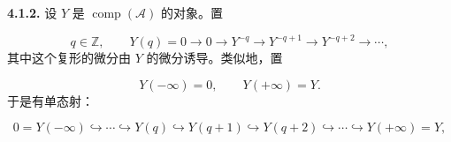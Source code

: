 \medskip\noindent\textbf{4.1.2.}\quad
设 $Y$ 是 $\operatorname{comp}(\mathcal A)$ 的对象。置

\begin{equation}
q\in\mathbb Z,\qquad
Y(q)=0\longrightarrow0\longrightarrow Y^{-q}\longrightarrow
Y^{-q+1}\longrightarrow Y^{-q+2}\longrightarrow\cdots,
\tag{4.1.2.1}
\end{equation}
其中这个复形的微分由 $Y$ 的微分诱导。类似地，置

\begin{equation}
Y(-\infty)=0,\qquad Y(+\infty)=Y.
\tag{4.1.2.2}
\end{equation}
于是有单态射：

\[
0=Y(-\infty)\hookrightarrow\cdots\hookrightarrow Y(q)
\hookrightarrow Y(q+1)\hookrightarrow Y(q+2)\hookrightarrow\cdots
\hookrightarrow Y(+\infty)=Y,
\]
\endgroup
